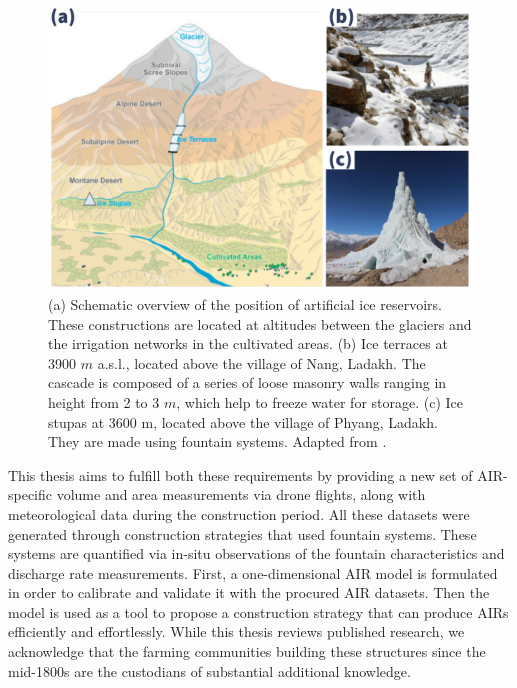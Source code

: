\begin{figure}[t]
	\centering
	\includegraphics[width=\textwidth]{figs/AIR_forms.jpg}

	\caption{ (a) Schematic overview of the position of artificial ice reservoirs. These constructions are located at
		altitudes between the glaciers and the irrigation networks in the cultivated areas. (b) Ice terraces at 3900
		$m$ \ac{a.s.l.}, located above the village of Nang, Ladakh. The cascade is composed of a series of loose masonry walls
		ranging in height from 2 to 3 $m$, which help to freeze water for storage. (c) Ice stupas at 3600 m, located
		above the village of Phyang, Ladakh. They are made using fountain systems. Adapted from \citet{nusserLocalKnowledgeGlobal2016}. }

	\label{fig:AIRforms}
\end{figure}

This thesis aims to fulfill both these requirements by providing a new set of AIR-specific volume and area
measurements via drone flights, along with meteorological data during the construction period. All these
datasets were generated through construction strategies that used fountain systems. These systems are quantified
via in-situ observations of the fountain characteristics and discharge rate measurements. First, a
one-dimensional AIR model is formulated in order to calibrate and validate it with the procured AIR datasets.
Then the model is used as a tool to propose a construction strategy that can produce \ac{AIRs} efficiently and
effortlessly. While this thesis reviews published research, we acknowledge that the farming communities building
these structures since the mid-1800s are the custodians of substantial additional knowledge.


